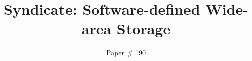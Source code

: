 \documentclass[10pt,twocolumn]{article}
\begin{document}
\title{\bf Syndicate: Software-defined Wide-area Storage}
\author{Paper \# 190}
\date{}
\maketitle
\thispagestyle{empty}











 
\end{document}
